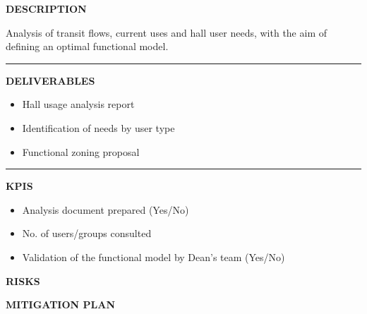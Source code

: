 \documentclass[11pt,a4paper]{scrreprt}
\newcommand{\fieldlabel}[1]{%
  {\footnotesize\sffamily\bfseries\color{mutedcolor}\MakeUppercase{#1}}\par\nopagebreak[4]
}
\newcommand{\fieldsep}{\vspace{3pt}\noindent\textcolor{bordercolor}{\rule{\linewidth}{0.4pt}}\vspace{3pt}\par}
\begin{document}
\begin{tcolorbox}[pabox={espcolor}{A.P.1.1 \enspace\textbullet\enspace Analysis of Hall Space Usage}]

\fieldlabel{Description}
{\small Analysis of transit flows, current uses and hall user needs, with the aim of defining an optimal functional model.}\par
\fieldsep
\fieldlabel{Deliverables}
{\small \begin{itemize}[noitemsep,topsep=2pt]
\item Hall usage analysis report
\item Identification of needs by user type
\item Functional zoning proposal
\end{itemize}}\par
\fieldsep
\fieldlabel{KPIs}
{\small \begin{itemize}[noitemsep,topsep=2pt]
\item Analysis document prepared (Yes/No)
\item No. of users/groups consulted
\item Validation of the functional model by Dean's team (Yes/No)
\end{itemize}}\par
\end{tcolorbox}
\begin{tcolorbox}[riskbox]
{\footnotesize\sffamily\bfseries\color{red!50!black} RISKS}\par{}
\end{tcolorbox}
\begin{tcolorbox}[mitbox]
{\footnotesize\sffamily\bfseries\color{green!40!black} MITIGATION PLAN}\par{}
\end{tcolorbox}
\vspace{8pt}
\end{document}
